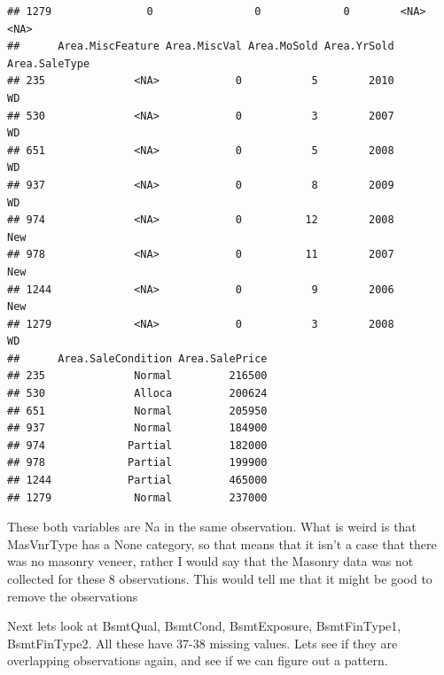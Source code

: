 \documentclass[]{article}
\newenvironment{Shaded}{\begin{snugshade}}{\end{snugshade}}
\newcommand{\KeywordTok}[1]{\textcolor[rgb]{0.13,0.29,0.53}{\textbf{#1}}}
\newcommand{\StringTok}[1]{\textcolor[rgb]{0.31,0.60,0.02}{#1}}
\newcommand{\CommentTok}[1]{\textcolor[rgb]{0.56,0.35,0.01}{\textit{#1}}}
\newcommand{\OperatorTok}[1]{\textcolor[rgb]{0.81,0.36,0.00}{\textbf{#1}}}
\newcommand{\NormalTok}[1]{#1}
\begin{document}
\begin{verbatim}
## 1279               0                0             0        <NA>       <NA>
##      Area.MiscFeature Area.MiscVal Area.MoSold Area.YrSold Area.SaleType
## 235              <NA>            0           5        2010            WD
## 530              <NA>            0           3        2007            WD
## 651              <NA>            0           5        2008            WD
## 937              <NA>            0           8        2009            WD
## 974              <NA>            0          12        2008           New
## 978              <NA>            0          11        2007           New
## 1244             <NA>            0           9        2006           New
## 1279             <NA>            0           3        2008            WD
##      Area.SaleCondition Area.SalePrice
## 235              Normal         216500
## 530              Alloca         200624
## 651              Normal         205950
## 937              Normal         184900
## 974             Partial         182000
## 978             Partial         199900
## 1244            Partial         465000
## 1279             Normal         237000
\end{verbatim}

These both variables are Na in the same observation. What is weird is
that MasVnrType has a None category, so that means that it isn't a case
that there was no masonry veneer, rather I would say that the Masonry
data was not collected for these 8 observations. This would tell me that
it might be good to remove the observations

\begin{Shaded}
\end{Shaded}

Next lets look at BsmtQual, BsmtCond, BsmtExposure, BsmtFinType1,
BsmtFinType2. All these have 37-38 missing values. Lets see if they are
overlapping observations again, and see if we can figure out a pattern.

\begin{Shaded}
\end{Shaded}
\end{document}
